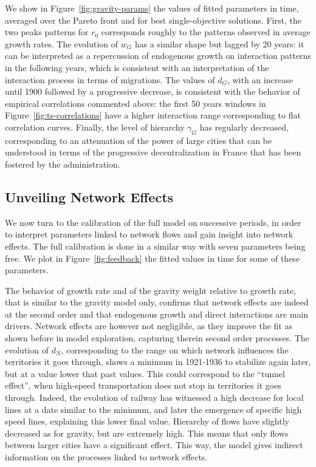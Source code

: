 \documentclass[Royal,sageh,times]{sagej}
\begin{document}
We show in Figure~\ref{fig:gravity-params} the values of fitted parameters in time, averaged over the Pareto front and for best single-objective solutions. First, the two peaks patterns for $r_0$ corresponds roughly to the patterns observed in average growth rates. The evolution of $w_G$ has a similar shape but lagged by 20 years: it can be interpreted as a repercussion of endogenous growth on interaction patterns in the following years, which is consistent with an interpretation of the interaction process in terms of migrations. The values of $d_G$, with an increase until 1900 followed by a progressive decrease, is consistent with the behavior of empirical correlations commented above: the first 50 years windows in Figure~\ref{fig:ts-correlations} have a higher interaction range corresponding to flat correlation curves. Finally, the level of hierarchy $\gamma_G$ has regularly decreased, corresponding to an attenuation of the power of large cities that can be understood in terms of the progressive decentralization in France that has been fostered by the administration.





\subsection*{Unveiling Network Effects}

We now turn to the calibration of the full model on successive periods, in order to interpret parameters linked to network flows and gain insight into network effects. The full calibration is done in a similar way with seven parameters being free. We plot in Figure~\ref{fig:feedback} the fitted values in time for some of these parameters.

The behavior of growth rate and of the gravity weight relative to growth rate, that is similar to the gravity model only, confirms that network effects are indeed at the second order and that endogenous growth and direct interactions are main drivers. Network effects are however not negligible, as they improve the fit as shown before in model exploration, capturing therein second order processes. The evolution of $d_N$, corresponding to the range on which network influences the territories it goes through, shows a minimum in 1921-1936 to stabilize again later, but at a value lower that past values. This could correspond to the ``tunnel effect'', when high-speed transportation does not stop in territories it goes through. Indeed, the evolution of railway has witnessed a high decrease for local lines at a date similar to the minimum, and later the emergence of specific high speed lines, explaining this lower final value. Hierarchy of flows have slightly decreased as for gravity, but are extremely high. This means that only flows between larger cities have a significant effect. This way, the model gives indirect information on the processes linked to network effects.
\end{document}
